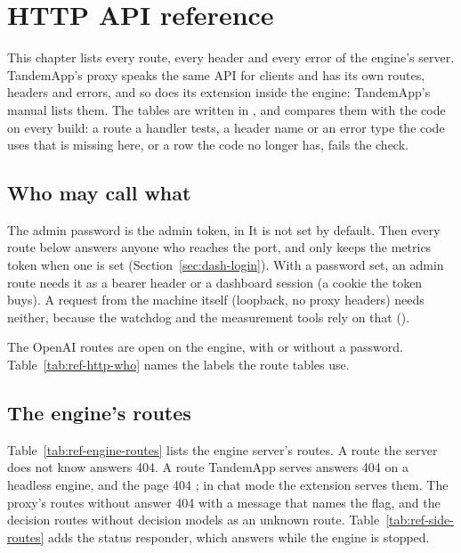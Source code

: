 \chapter{HTTP API reference}\label{ch:ref-http}

This chapter lists every route, every header and every error of the engine's server. TandemApp's proxy speaks the same API for clients and has its own routes, headers and errors, and so does its extension inside the engine: TandemApp's manual lists them. The tables are written in , and  compares them with the code on every build: a route a handler tests, a header name or an error type the code uses that is missing here, or a row the code no longer has, fails the check.

\section{Who may call what}

The admin password is the admin token,  in  It is not set by default. Then every route below answers anyone who reaches the port, and only  keeps the metrics token when one is set (Section~\ref{sec:dash-login}). With a password set, an admin route needs it as a bearer header or a dashboard session (a cookie the token buys). A request from the machine itself (loopback, no proxy headers) needs neither, because the watchdog and the measurement tools rely on that ().

The OpenAI routes are open on the engine, with or without a password. Table~\ref{tab:ref-http-who} names the labels the route tables use.



\section{The engine's routes}

Table~\ref{tab:ref-engine-routes} lists the engine server's routes. A route the server does not know answers 404. A route TandemApp serves answers 404  on a headless engine, and the page 404 ; in chat mode the extension serves them. The proxy's routes without  answer 404 with a message that names the flag, and the decision routes without decision models as an unknown route. Table~\ref{tab:ref-side-routes} adds the status responder, which answers while the engine is stopped.

